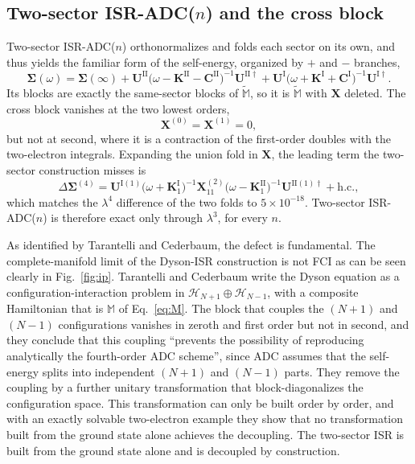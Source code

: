 \documentclass[aip,jcp,reprint,noshowkeys,superscriptaddress]{revtex4-1}
\newcommand{\la}{\lambda}
\newcommand{\bbM}{\mathbb{M}}
\newcommand{\tM}{\tilde{\mathbb{M}}}
\newcommand{\I}{\mathrm{I}}
\newcommand{\II}{\mathrm{II}}
\begin{document}
\subsection{Two-sector ISR-ADC(\texorpdfstring{$n$}{n}) and the cross block}
\label{sec:twosector}
Two-sector ISR-ADC($n$) orthonormalizes and folds each sector on its own,
and thus yields the familiar form of the self-energy,
organized by $+$ and $-$ branches,
\begin{equation}
\bm\Sigma(\omega) = \bm\Sigma(\infty)
+ \mathbf U^{\II}\big(\omega-\mathbf K^{\II}-\mathbf C^{\II}\big)^{-1}\mathbf U^{\II\dagger}
+ \mathbf U^{\I}\big(\omega+\mathbf K^{\I}+\mathbf C^{\I}\big)^{-1}\mathbf U^{\I\dagger} .
\label{eq:twosector}
\end{equation}
Its blocks are exactly the same-sector blocks of $\tM$, so it is $\tM$ with $\mathbf X$ deleted. The cross
block vanishes at the two lowest orders,
\begin{equation}
\mathbf X^{(0)} = \mathbf X^{(1)} = 0 ,
\end{equation}
but not at second, where it is a contraction of the first-order doubles with the two-electron integrals.
Expanding the union fold in $\mathbf X$, the leading term the two-sector construction misses is
\begin{equation}
\Delta\bm\Sigma^{(4)} = \mathbf U^{\I(1)}\big(\omega+\mathbf K^{\I}_1\big)^{-1}\mathbf X^{(2)}_{11}
\big(\omega-\mathbf K^{\II}_1\big)^{-1}\mathbf U^{\II(1)\dagger} + \mathrm{h.c.} ,
\label{eq:defect}
\end{equation}
which matches the $\la^4$ difference of the two folds to $5\times10^{-18}$. Two-sector ISR-ADC($n$) is
therefore exact only through $\la^3$, for every $n$.

As identified by Tarantelli and Cederbaum,\cite{tarantelli1992configuration}
the defect is fundamental. The complete-manifold limit of the Dyson-ISR construction is not FCI
as can be seen clearly in Fig.~\ref{fig:ip}.
Tarantelli and Cederbaum write the Dyson equation as a configuration-interaction problem in
$\mathcal H_{N+1}\oplus\mathcal H_{N-1}$, with a composite Hamiltonian that is $\bbM$ of Eq.~\eqref{eq:M}.
The block that couples the $(N+1)$ and $(N-1)$ configurations vanishes in zeroth and first order but not
in second, and they conclude that this coupling ``prevents the possibility of
reproducing analytically the fourth-order ADC scheme'', since ADC assumes that
the self-energy splits into independent $(N+1)$ and $(N-1)$ parts.
They remove the coupling by a further
unitary transformation that block-diagonalizes the configuration space. This transformation can only be
built order by order, and with an exactly solvable two-electron example they show that no transformation
built from the ground state alone achieves the decoupling. The two-sector ISR is built from the ground state
alone and is decoupled by construction.
\end{document}
